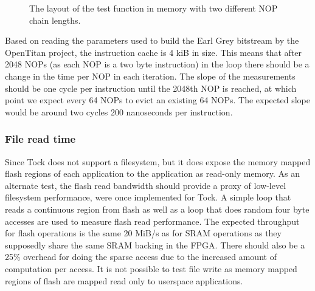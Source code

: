 \documentclass{article}
\begin{document}
\begin{figure}[htbp]
  \centering
  
  \caption{The layout of the test function in memory with two different NOP chain lengths.} \label{nop-diagram}
\end{figure}

Based on reading the parameters used to build the Earl Grey bitstream by the OpenTitan project, the instruction cache is 4 kiB in size. This means that after 2048 NOPs (as each NOP is a two byte instruction) in the loop there should be a change in the time per NOP in each iteration. The slope of the measurements should be one cycle per instruction until the 2048th NOP is reached, at which point we expect every 64 NOPs to evict an existing 64 NOPs. The expected slope would be around two cycles 200 nanoseconds per instruction.

\subsubsection{File read time}
Since Tock does not support a filesystem, but it does expose the memory mapped flash regions of each application to the application as read-only memory. As an alternate test, the flash read bandwidth should provide a proxy of low-level filesystem performance, were once implemented for Tock. A simple loop that reads a continuous region from flash as well as a loop that does random four byte accesses are used to measure flash read performance. The expected throughput for flash operations is the same 20 MiB/s as for SRAM operations as they supposedly share the same SRAM backing in the FPGA. There should also be a 25\% overhead for doing the sparse access due to the increased amount of computation per access. It is not possible to test file write as memory mapped regions of flash are mapped read only to userspace applications.
\end{document}
